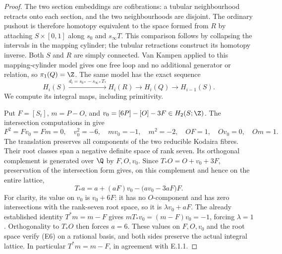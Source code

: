 \begin{proof}
The two section embeddings are cofibrations: a tubular neighbourhood
retracts onto each section, and the two neighbourhoods are disjoint.
The ordinary pushout is therefore homotopy equivalent to the space
formed from $R$ by attaching $S\times[0,1]$ along
$s_0$ and $s_\infty T$. This comparison follows by collapsing the
intervals in the mapping cylinder; the tubular retractions construct
its homotopy inverse. Both $S$ and $R$ are simply connected. Van
Kampen applied to this mapping-cylinder model gives one free loop
and no additional generator or relation, so $\pi_1(Q)=\Z$.
The same model has the exact sequence
\[
 H_i(S)\xrightarrow{d_i=s_{0*}-s_{\infty*}T_*}H_i(R)
 \longrightarrow H_i(Q)\longrightarrow H_{i-1}(S).             \tag{E4}
\]
We compute its integral maps, including primitivity.

Put $F=[S_t]$, $m=P-O$, and
$v_0=[6P]-[O]-3F\in H_2(S;\Z)$. The intersection computations in
\cite[Lemma 2.1]{E26} give
\[
 F^2=Fv_0=Fm=0,\quad v_0^2=-6,\quad mv_0=-1,\quad m^2=-2,
 \quad OF=1,\quad Ov_0=0,\quad Om=1.                         \tag{E5}
\]
The translation preserves all components of the two reducible
Kodaira fibres. Their root classes span a negative definite space of
rank seven. Its orthogonal complement is generated over $\Q$ by
$F,O,v_0$. Since $T_*O=O+v_0+3F$, preservation of the intersection
form gives, on this complement and hence on the entire lattice,
\[
 T_*a=a+(aF)v_0-\bigl(av_0-3aF\bigr)F.                       \tag{E6}
\]
For clarity, its value on $v_0$ is $v_0+6F$: it has no $O$-component
and has zero intersections with the rank-seven root space, so it is
$\lambda v_0+aF$. The already established identity $T^*m=m-F$ gives
$mT_*v_0=(m-F)v_0=-1$, forcing $\lambda=1$. Orthogonality to
$T_*O$ then forces $a=6$. These
values on $F,O,v_0$ and the root space verify (E6) on a rational basis,
and both sides preserve the actual integral lattice. In particular
$T^*m=m-F$, in agreement with E.1.1.


\end{proof}
